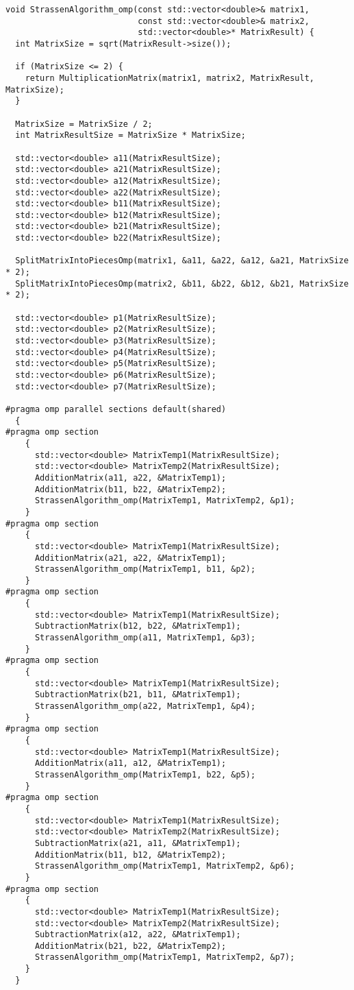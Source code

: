 \documentclass{report}
\begin{document}
\begin{lstlisting}
void StrassenAlgorithm_omp(const std::vector<double>& matrix1,
                           const std::vector<double>& matrix2,
                           std::vector<double>* MatrixResult) {
  int MatrixSize = sqrt(MatrixResult->size());

  if (MatrixSize <= 2) {
    return MultiplicationMatrix(matrix1, matrix2, MatrixResult, MatrixSize);
  }

  MatrixSize = MatrixSize / 2;
  int MatrixResultSize = MatrixSize * MatrixSize;

  std::vector<double> a11(MatrixResultSize);
  std::vector<double> a21(MatrixResultSize);
  std::vector<double> a12(MatrixResultSize);
  std::vector<double> a22(MatrixResultSize);
  std::vector<double> b11(MatrixResultSize);
  std::vector<double> b12(MatrixResultSize);
  std::vector<double> b21(MatrixResultSize);
  std::vector<double> b22(MatrixResultSize);

  SplitMatrixIntoPiecesOmp(matrix1, &a11, &a22, &a12, &a21, MatrixSize * 2);
  SplitMatrixIntoPiecesOmp(matrix2, &b11, &b22, &b12, &b21, MatrixSize * 2);

  std::vector<double> p1(MatrixResultSize);
  std::vector<double> p2(MatrixResultSize);
  std::vector<double> p3(MatrixResultSize);
  std::vector<double> p4(MatrixResultSize);
  std::vector<double> p5(MatrixResultSize);
  std::vector<double> p6(MatrixResultSize);
  std::vector<double> p7(MatrixResultSize);

#pragma omp parallel sections default(shared)
  {
#pragma omp section
    {
      std::vector<double> MatrixTemp1(MatrixResultSize);
      std::vector<double> MatrixTemp2(MatrixResultSize);
      AdditionMatrix(a11, a22, &MatrixTemp1);
      AdditionMatrix(b11, b22, &MatrixTemp2);
      StrassenAlgorithm_omp(MatrixTemp1, MatrixTemp2, &p1);
    }
#pragma omp section
    {
      std::vector<double> MatrixTemp1(MatrixResultSize);
      AdditionMatrix(a21, a22, &MatrixTemp1);
      StrassenAlgorithm_omp(MatrixTemp1, b11, &p2);
    }
#pragma omp section
    {
      std::vector<double> MatrixTemp1(MatrixResultSize);
      SubtractionMatrix(b12, b22, &MatrixTemp1);
      StrassenAlgorithm_omp(a11, MatrixTemp1, &p3);
    }
#pragma omp section
    {
      std::vector<double> MatrixTemp1(MatrixResultSize);
      SubtractionMatrix(b21, b11, &MatrixTemp1);
      StrassenAlgorithm_omp(a22, MatrixTemp1, &p4);
    }
#pragma omp section
    {
      std::vector<double> MatrixTemp1(MatrixResultSize);
      AdditionMatrix(a11, a12, &MatrixTemp1);
      StrassenAlgorithm_omp(MatrixTemp1, b22, &p5);
    }
#pragma omp section
    {
      std::vector<double> MatrixTemp1(MatrixResultSize);
      std::vector<double> MatrixTemp2(MatrixResultSize);
      SubtractionMatrix(a21, a11, &MatrixTemp1);
      AdditionMatrix(b11, b12, &MatrixTemp2);
      StrassenAlgorithm_omp(MatrixTemp1, MatrixTemp2, &p6);
    }
#pragma omp section
    {
      std::vector<double> MatrixTemp1(MatrixResultSize);
      std::vector<double> MatrixTemp2(MatrixResultSize);
      SubtractionMatrix(a12, a22, &MatrixTemp1);
      AdditionMatrix(b21, b22, &MatrixTemp2);
      StrassenAlgorithm_omp(MatrixTemp1, MatrixTemp2, &p7);
    }
  }


\end{lstlisting}
\end{document}
